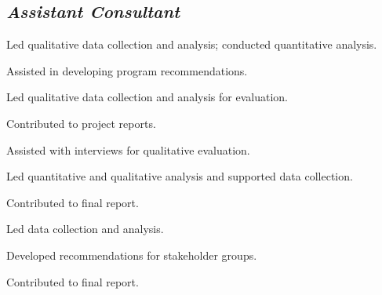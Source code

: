 \subsection{\textit{Assistant Consultant}}
\begin{cvtable}
        {\color{cvsectioncolor}{Penn State Acoustics Program}}
        {}
        {\begin{tightitemize}
            \item Led qualitative data collection and analysis; conducted quantitative analysis.
            \item Assisted in developing program recommendations.
        \end{tightitemize}}
        {\color{cvsectioncolor}{RIEF - Virtual Community of Practice}}
        {}
        {\begin{tightitemize}
            \item Led qualitative data collection and analysis for evaluation.
            \item Contributed to project reports.
        \end{tightitemize}}
    \cvitem{}
        {\color{cvsectioncolor}{IGE - Personalized Learning Module for Graduate STEM Education}}
        {}
        {\begin{tightitemize}
            \item Assisted with interviews for qualitative evaluation.
        \end{tightitemize}}  
        {\color{cvsectioncolor}{Engineering Education and Research Centers}}
        {}
        {\begin{tightitemize}
            \item Led quantitative and qualitative analysis and supported data collection.
            \item Contributed to final report.
        \end{tightitemize}}
    \cvitem{}
        {\color{cvsectioncolor}{Capacity Building for Research at Minority Serving Institutions}}
        {}
        {\begin{tightitemize}
            \item Led data collection and analysis.
            \item Developed recommendations for stakeholder groups.
            \item Contributed to final report.
        \end{tightitemize}}
\end{cvtable}